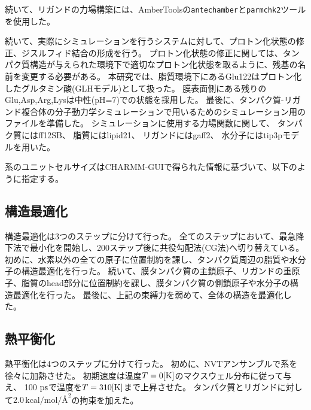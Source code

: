 続いて、リガンドの力場構築には、AmberToolsの\texttt{antechamber}と\texttt{parmchk2}ツールを使用した。

続いて、実際にシミュレーションを行うシステムに対して、プロトン化状態の修正、ジスルフィド結合の形成を行う。
プロトン化状態の修正に関しては、タンパク質構造が与えられた環境下で適切なプロトン化状態を取るように、残基の名前を変更する必要がある。
本研究では、脂質環境下にあるGlu122はプロトン化したグルタミン酸(GLHモデル)として扱った。
膜表面側にある残りのGlu,Asp,Arg,Lysは中性(pH=7)での状態を採用した。
最後に、タンパク質-リガンド複合体の分子動力学シミュレーションで用いるためのシミュレーション用のファイルを準備した。
シミュレーションに使用する力場関数に関して、
タンパク質にはff12SB、
脂質にはlipid21、
リガンドにはgaff2、
水分子にはtip3pモデルを用いた。

系のユニットセルサイズはCHARMM-GUIで得られた情報に基づいて、以下のように指定する。
\begin{table}[!ht]
  \centering
  \caption{シミュレーションに用いた系の大きさ}
  \label{tab:system_size}
\end{table}


\subsection{構造最適化}
構造最適化は3つのステップに分けて行った。
全てのステップにおいて、最急降下法で最小化を開始し、200ステップ後に共役勾配法(CG法)へ切り替えている。
初めに、水素以外の全ての原子に位置制約を課し、タンパク質周辺の脂質や水分子の構造最適化を行った。
続いて、膜タンパク質の主鎖原子、リガンドの重原子、脂質のhead部分に位置制約を課し、膜タンパク質の側鎖原子や水分子の構造最適化を行った。
最後に、上記の束縛力を弱めて、全体の構造を最適化した。

\subsection{熱平衡化}
熱平衡化は4つのステップに分けて行った。
初めに、NVTアンサンブルで系を徐々に加熱させた。
初期速度は温度$T = 0 \rm{[K]}$のマクスウェル分布に従って与え、 
100 $\rm{ps}$で温度を$T = 310 \rm{[K]}$まで上昇させた。
タンパク質とリガンドに対して$2.0 \, \text{kcal/mol/\AA}^2$の拘束を加えた。

